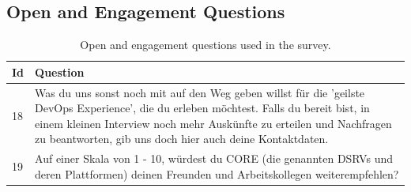 \documentclass[a4paper,12pt]{article}
\begin{document}
    \subsection{Open and Engagement Questions}
    \label{subsec:openandengagement}
    \begin{table}[!htbp]
        \begin{center}
            \begin{tabularx}{\textwidth}{lX}
                \toprule
                Id & Question                                                                                                                                                                                                                                                                    \\
                \midrule
                18 & Was du uns sonst noch mit auf den Weg geben willst für die 'geilste DevOps Experience', die du erleben möchtest. Falls du bereit bist, in einem kleinen Interview noch mehr Auskünfte zu erteilen und Nachfragen zu beantworten, gib uns doch hier auch deine Kontaktdaten. \\
                19 & Auf einer Skala von 1 - 10, würdest du CORE (die genannten DSRVs und deren Plattformen) deinen Freunden und Arbeitskollegen weiterempfehlen?                                                                                                                                \\
                \bottomrule
            \end{tabularx}
        \end{center}
        \caption{\label{tab:oetable} Open and engagement questions used in the survey.}
    \end{table}
\end{document}

